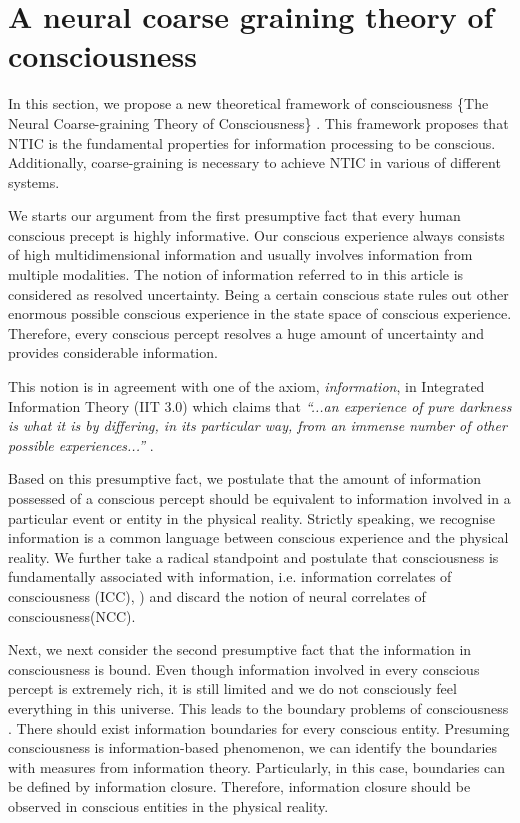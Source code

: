 \documentclass[utf8]{article}
\newcommand{\tnamefull}{The Neural Coarse-graining Theory of Consciousness}
\newcommand{\rlstart}[1]{  %
        \setlength\changebarwidth{#1pt*2}  %
        \hspace*{-40pt}
        \cbstart{\textcolor{red}{\newline\textbf{iteration #1}}\newline}}
\newcommand{\myQuote}[1]{\textit{``#1''}}
\begin{document}
	\section{A neural coarse graining theory of consciousness}
	
\rlstart{5}


        In this section, we propose a new theoretical framework of consciousness \{\tnamefull\} . This framework proposes that NTIC is the fundamental properties for information processing to be conscious. Additionally, coarse-graining is necessary to achieve NTIC in various of different systems. 

        We starts our argument from the first presumptive fact that every human conscious precept is highly informative. Our conscious experience always consists of high multidimensional information and usually involves information from multiple modalities. The notion of information referred to in this article is considered as resolved uncertainty. Being a certain conscious state rules out other enormous possible conscious experience in the state space of conscious experience. Therefore, every conscious percept resolves a huge amount of uncertainty and provides considerable information. 
        
        This notion is in agreement with one of the axiom, \textit{information}, in Integrated Information Theory (IIT 3.0) which claims that \myQuote{...an experience of pure darkness is what it is by differing, in its particular way, from an immense number of other possible experiences...} \citep[p. 2]{oizumi2014phenomenology}.
        
        Based on this presumptive fact, we postulate that the amount of information possessed of a conscious percept should be equivalent to information involved in a particular event or entity in the physical reality. Strictly speaking, we recognise information is a common language between conscious experience and the physical reality. We further take a radical standpoint and postulate that consciousness is fundamentally associated with information, i.e. information correlates of consciousness (ICC), \cite{chalmers1996conscious, tononi2004information, gamez2011information, Gamez2016}) and discard the notion of neural correlates of consciousness(NCC). 
        
        Next, we next consider the second presumptive fact that the information in consciousness is bound. Even though information involved in every conscious percept is extremely rich, it is still limited and we do not consciously feel everything in this universe. This leads to the boundary problems of consciousness \cite{goff2006experiences}. There should exist information boundaries for every conscious entity. Presuming consciousness is information-based phenomenon, we can identify the boundaries with measures from information theory. Particularly, in this case, boundaries can be defined by information closure. Therefore, information closure should be observed in conscious entities in the physical reality. 
        
\end{document}
